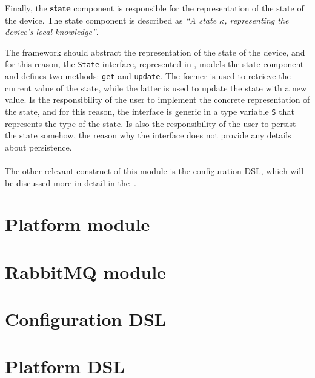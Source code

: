 Finally, the \textbf{state} component is responsible for the representation of the state of the device.
The state component is described as \textit{``A state $\kappa$, representing the device's local knowledge''}.

The framework should abstract the representation of the state of the device, and for this reason, the \texttt{State} interface, represented in
, models the state component and defines two methods: \texttt{get} and \texttt{update}.
The former is used to retrieve the current value of the state, while the latter is used to update the state with a new value.
Is the responsibility of the user to implement the concrete representation of the state, and for this reason, the interface is generic in a type
variable \texttt{S} that represents the type of the state. Is also the responsibility of the user to persist the state somehow, the reason why the
interface does not provide any details about persistence.



\paragraph*{}

The other relevant construct of this module is the configuration DSL, which will be discussed more in detail in the~.


\section{Platform module}
\label{sec:platform-module-impl}


\section{RabbitMQ module}
\label{sec:rabbitmq-module-impl}


\section{Configuration DSL}
\label{sec:configuration-dsl-impl}


\section{Platform DSL}
\label{sec:platform-dsl-impl}
